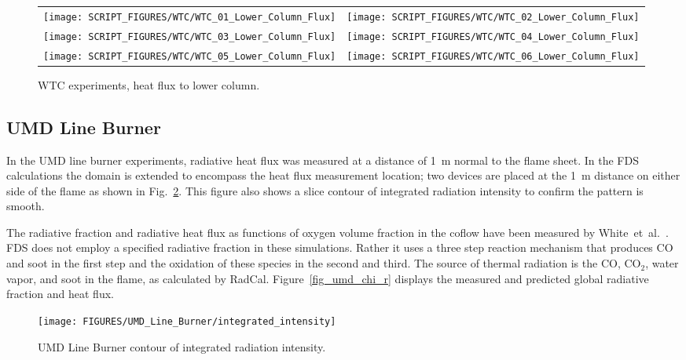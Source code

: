 \begin{figure}[p]
\begin{tabular*}{\textwidth}{l@{\extracolsep{\fill}}r}
\texttt{[image: SCRIPT\_FIGURES/WTC/WTC\_01\_Lower\_Column\_Flux]} &
\texttt{[image: SCRIPT\_FIGURES/WTC/WTC\_02\_Lower\_Column\_Flux]} \\
\texttt{[image: SCRIPT\_FIGURES/WTC/WTC\_03\_Lower\_Column\_Flux]} &
\texttt{[image: SCRIPT\_FIGURES/WTC/WTC\_04\_Lower\_Column\_Flux]} \\
\texttt{[image: SCRIPT\_FIGURES/WTC/WTC\_05\_Lower\_Column\_Flux]} &
\texttt{[image: SCRIPT\_FIGURES/WTC/WTC\_06\_Lower\_Column\_Flux]}
\end{tabular*}
\caption[WTC experiments, heat flux to lower column]
{WTC experiments, heat flux to lower column.}
\label{NIST_WTC_Lower_Column_Flux}
\end{figure}

\clearpage

\subsection{UMD Line Burner}

In the UMD line burner experiments, radiative heat flux was measured at a distance of 1~m normal to the flame sheet.  In the FDS calculations the domain is extended to encompass the heat flux measurement location; two devices are placed at the 1~m distance on either side of the flame as shown in Fig.~\ref{fig_umd_integrated_intensity}. This figure also shows a slice contour of integrated radiation intensity to confirm the pattern is smooth.

The radiative fraction and radiative heat flux as functions of oxygen volume fraction in the coflow have been measured by White~et~al.~\cite{White:2015}.  FDS does not employ a specified radiative fraction in these simulations. Rather it uses a three step reaction mechanism that produces CO and soot in the first step and the oxidation of these species in the second and third. The source of thermal radiation is the CO, CO$_2$, water vapor, and soot in the flame, as calculated by RadCal. Figure~\ref{fig_umd_chi_r} displays the measured and predicted global radiative fraction and heat flux.

\begin{figure}[h!]
\centering
\texttt{[image: FIGURES/UMD\_Line\_Burner/integrated\_intensity]}
\caption{UMD Line Burner contour of integrated radiation intensity.}
\label{fig_umd_integrated_intensity}
\end{figure}

